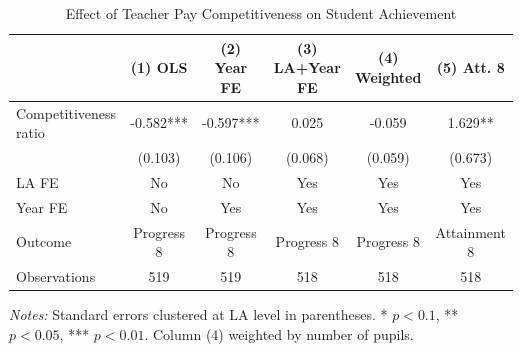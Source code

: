 \begin{table}[htbp]
\centering
\caption{Effect of Teacher Pay Competitiveness on Student Achievement}
\label{tab:main}
\begin{tabular}{lccccc}
\toprule
 & (1) OLS & (2) Year FE & (3) LA+Year FE & (4) Weighted & (5) Att. 8 \\
\midrule
Competitiveness ratio & -0.582*** & -0.597*** & 0.025 & -0.059 & 1.629** \\
 & (0.103) & (0.106) & (0.068) & (0.059) & (0.673) \\
\midrule
LA FE & No & No & Yes & Yes & Yes \\
Year FE & No & Yes & Yes & Yes & Yes \\
Outcome & Progress 8 & Progress 8 & Progress 8 & Progress 8 & Attainment 8 \\
Observations & 519 & 519 & 518 & 518 & 518 \\
\bottomrule
\end{tabular}
\begin{tablenotes}[flushleft]
\small
\item \textit{Notes:} Standard errors clustered at LA level in parentheses. * $p<0.1$, ** $p<0.05$, *** $p<0.01$. Column (4) weighted by number of pupils.
\end{tablenotes}
\end{table}
